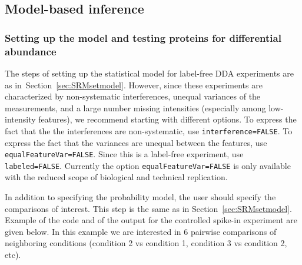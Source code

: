 \documentclass[11pt]{article}
\def\secref#1{Section~\ref{sec:#1}}
\begin{document}
\subsection{Model-based inference \label{sec:DDAinference}}

\subsubsection{Setting up the model and testing proteins for differential abundance}

The steps of setting up the statistical model for label-free DDA experiments are as in~\secref{SRMsetmodel}. However, since these experiments are characterized by non-systematic interferences, unequal variances of the measurements, and a large number missing intensities (especially among low-intensity features), we recommend starting with different options. To express the fact that the the interferences are non-systematic, use {\tt interference=FALSE}. To express the fact that the variances are unequal between the features, use {\tt equalFeatureVar=FALSE}. Since this is a label-free experiment, use {\tt labeled=FALSE}. Currently the option {\tt equalFeatureVar=FALSE} is only available with the reduced scope of biological and technical replication.

In addition to specifying the probability model, the user should specify the comparisons of interest. This step is the same as in \secref{SRMsetmodel}. Example of the code and of the output for the controlled spike-in experiment are given below. In this example  we are interested in 6 pairwise comparisons of neighboring conditions (condition 2 vs condition 1, condition 3 vs condition 2, etc).
\end{document}
